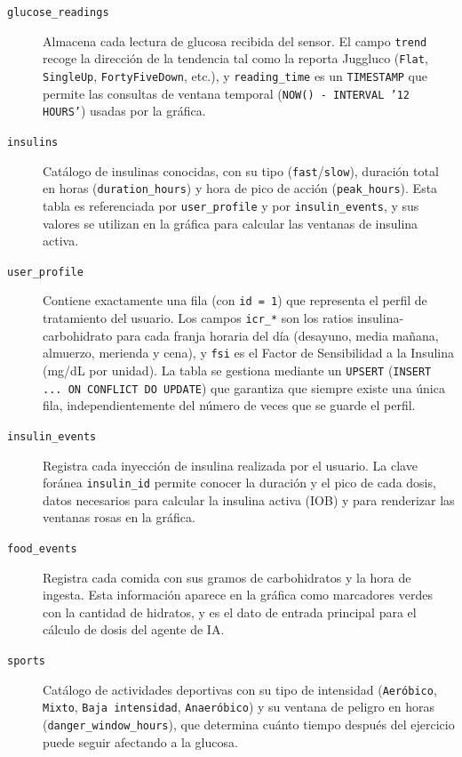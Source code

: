 \begin{description}
    \item[\texttt{glucose\_readings}] Almacena cada lectura de glucosa recibida del
    sensor. El campo \texttt{trend} recoge la dirección de la tendencia tal como la
    reporta Juggluco (\texttt{Flat}, \texttt{SingleUp}, \texttt{FortyFiveDown}, etc.),
    y \texttt{reading\_time} es un \texttt{TIMESTAMP} que permite las consultas de
    ventana temporal (\texttt{NOW() - INTERVAL '12 HOURS'}) usadas por la gráfica.

    \item[\texttt{insulins}] Catálogo de insulinas conocidas, con su tipo
    (\texttt{fast}/\texttt{slow}), duración total en horas (\texttt{duration\_hours}) y
    hora de pico de acción (\texttt{peak\_hours}). Esta tabla es referenciada por
    \texttt{user\_profile} y por \texttt{insulin\_events}, y sus valores se utilizan
    en la gráfica para calcular las ventanas de insulina activa.

    \item[\texttt{user\_profile}] Contiene exactamente una fila (con \texttt{id = 1})
    que representa el perfil de tratamiento del usuario. Los campos \texttt{icr\_*}
    son los ratios insulina-carbohidrato para cada franja horaria del día
    (desayuno, media mañana, almuerzo, merienda y cena), y \texttt{fsi} es el
    Factor de Sensibilidad a la Insulina (mg/dL por unidad). La tabla se gestiona
    mediante un \texttt{UPSERT} (\texttt{INSERT ... ON CONFLICT DO UPDATE}) que
    garantiza que siempre existe una única fila, independientemente del número de
    veces que se guarde el perfil.

    \item[\texttt{insulin\_events}] Registra cada inyección de insulina realizada por
    el usuario. La clave foránea \texttt{insulin\_id} permite conocer la duración y el
    pico de cada dosis, datos necesarios para calcular la insulina activa (IOB) y para
    renderizar las ventanas rosas en la gráfica.

    \item[\texttt{food\_events}] Registra cada comida con sus gramos de carbohidratos
    y la hora de ingesta. Esta información aparece en la gráfica como marcadores
    verdes con la cantidad de hidratos, y es el dato de entrada principal para el
    cálculo de dosis del agente de IA.

    \item[\texttt{sports}] Catálogo de actividades deportivas con su tipo de
    intensidad (\texttt{Aeróbico}, \texttt{Mixto}, \texttt{Baja intensidad},
    \texttt{Anaeróbico}) y su ventana de peligro en horas
    (\texttt{danger\_window\_hours}), que determina cuánto tiempo después del
    ejercicio puede seguir afectando a la glucosa.


\end{description}
